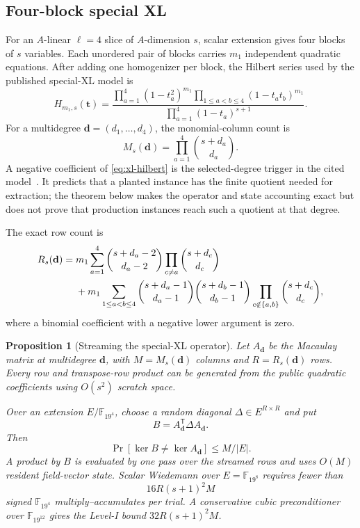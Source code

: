 \documentclass[11pt]{article}
\newtheorem{proposition}[theorem]{Proposition}
\newcommand{\F}{\mathbb F}
\newcommand{\transpose}{\mathsf T}
\begin{document}
\subsection{Four-block special XL}
For an $A$-linear $\ell=4$ slice of $A$-dimension $s$, scalar extension gives
four blocks of $s$ variables.  Each unordered pair of blocks carries $m_1$
independent quadratic equations.  After adding one homogenizer per block, the
Hilbert series used by the published special-XL model is
\begin{equation}
 H_{m_1,s}(\mathbf t)=
 \frac{\prod_{a=1}^4(1-t_a^2)^{m_1}
       \prod_{1\le a<b\le4}(1-t_at_b)^{m_1}}
      {\prod_{a=1}^4(1-t_a)^{s+1}}.                 \label{eq:xl-hilbert}
\end{equation}
For a multidegree $\mathbf d=(d_1,\ldots,d_4)$, the monomial-column count is
\begin{equation}
  M_s(\mathbf d)=\prod_{a=1}^4\binom{s+d_a}{d_a}.    \label{eq:xl-columns}
\end{equation}
A negative coefficient of \eqref{eq:xl-hilbert} is the selected-degree trigger
in the cited model~\cite{Cabarcas2025SNOVA}.  It predicts that a planted
instance has the finite quotient needed for extraction; the theorem below
makes the operator and state accounting exact but does not prove that
production instances reach such a quotient at that degree.

The exact row count is
\begin{align}
 R_s(\mathbf d)
={}&m_1\sum_{a=1}^4
 \binom{s+d_a-2}{d_a-2}\prod_{c\ne a}\binom{s+d_c}{d_c}
 \notag\\
 &+m_1\sum_{1\le a<b\le4}
 \binom{s+d_a-1}{d_a-1}
 \binom{s+d_b-1}{d_b-1}
 \prod_{c\notin\{a,b\}}\binom{s+d_c}{d_c},          \label{eq:xl-rows}
\end{align}
where a binomial coefficient with a negative lower argument is zero.

\begin{proposition}[Streaming the special-XL operator]
\label{prop:streamed-xl}
Let $A_{\mathbf d}$ be the Macaulay matrix at multidegree $\mathbf d$, with
$M=M_s(\mathbf d)$ columns and $R=R_s(\mathbf d)$ rows.  Every row and
transpose-row product can be generated from the public quadratic coefficients
using $O(s^2)$ scratch space.

Over an extension $E/\F_{19^4}$, choose a random diagonal
$\Delta\in E^{R\times R}$ and put
\[
  B=A_{\mathbf d}^\transpose\Delta A_{\mathbf d}.
\]
Then
\[
  \Pr[\ker B\ne\ker A_{\mathbf d}]\le M/|E|.
\]
A product by $B$ is evaluated by one pass over the streamed rows and uses
$O(M)$ resident field-vector state.  Scalar Wiedemann over $E=\F_{19^8}$
requires fewer than
\begin{equation}
  16R(s+1)^2M                                      \label{eq:xl-stream-work}
\end{equation}
signed $\F_{19^4}$ multiply--accumulates per trial.  A conservative cubic
preconditioner over $\F_{19^{12}}$ gives the Level-I bound
$32R(s+1)^2M$.
\end{proposition}
\end{document}
